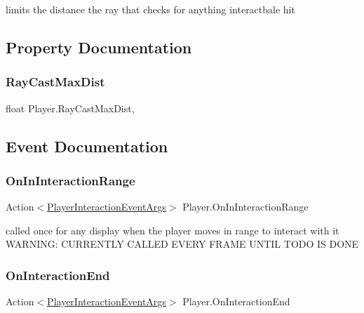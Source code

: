 limits the distance the ray that checks for anything interactbale hit 



\subsection{Property Documentation}
\mbox{\label{class_player_adafd180f492907d445a3ace023f63040}} 
\subsubsection{\texorpdfstring{Ray\+Cast\+Max\+Dist}{RayCastMaxDist}}
{\footnotesize\ttfamily float Player.\+Ray\+Cast\+Max\+Dist\hspace{0.3cm}{\ttfamily [get]}, {}}



\subsection{Event Documentation}
\mbox{\label{class_player_a6da2c61e5e06e970835852ed3d65157c}} 
\subsubsection{\texorpdfstring{On\+In\+Interaction\+Range}{OnInInteractionRange}}
{\footnotesize\ttfamily Action$<$\mbox{\hyperlink{class_player_interaction_event_args}{Player\+Interaction\+Event\+Args}}$>$ Player.\+On\+In\+Interaction\+Range}



called once for any display when the player moves in range to interact with it W\+A\+R\+N\+I\+NG\+: C\+U\+R\+R\+E\+N\+T\+LY C\+A\+L\+L\+ED E\+V\+E\+RY F\+R\+A\+ME U\+N\+T\+IL T\+O\+DO IS D\+O\+NE 

\mbox{\label{class_player_a08a7813ef2273b80058d734256218cff}} 
\subsubsection{\texorpdfstring{On\+Interaction\+End}{OnInteractionEnd}}
{\footnotesize\ttfamily Action$<$\mbox{\hyperlink{class_player_interaction_event_args}{Player\+Interaction\+Event\+Args}}$>$ Player.\+On\+Interaction\+End}



